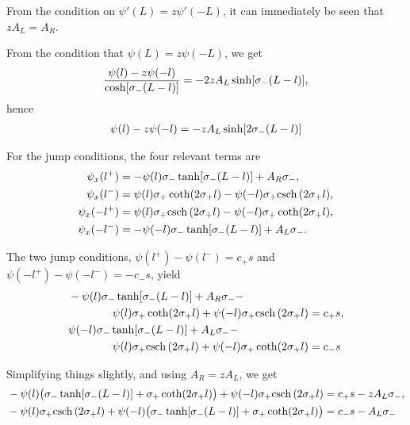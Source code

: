 From the condition on $\psi'(L) = z\psi'(-L)$, it can immediately be seen that $zA_L = A_R$.

From the condition that $\psi(L) = z\psi(-L)$, we get
% 
\begin{equation*}
\begin{split}
	\frac{\psi(l)-z\psi(-l)}{\cosh[\sigma_-(L-l)]} = -2zA_L\sinh[\sigma_-(L-l)],
\end{split}
\end{equation*}
% 
hence
% 
\begin{equation}
\label{eqn:floquet1}
\begin{split}
	\psi(l)-z\psi(-l) = -zA_L\sinh[2\sigma_-(L-l)]
\end{split}
\end{equation}
% 

For the jump conditions, the four relevant terms are
% 
\begin{equation*}
\begin{split}
\begin{aligned}
	\psi_x(l^+) &= -\psi(l)\sigma_-\tanh[\sigma_-(L-l)] + A_R\sigma_-,\\
	\psi_x(l^-) &=  \psi(l)\sigma_+\coth(2\sigma_+l) - \psi(-l)\sigma_+\mathrm{csch} \,(2\sigma_+l),\\
	\psi_x(-l^+) &= \psi(l)\sigma_+\mathrm{csch} \,(2\sigma_+l) - \psi(-l)\sigma_+\coth(2\sigma_+l),\\
	\psi_x(-l^-) &= -\psi(-l)\sigma_-\tanh[\sigma_-(L-l)] + A_L\sigma_-.
\end{aligned}
\end{split}
\end{equation*}
% 

The two jump conditions, $\psi(l^+) - \psi(l^-) = c_+s$ and $\psi(-l^+) - \psi(-l^-) = - c_-s$, yield
% 
\begin{equation*}
\begin{split}
\begin{aligned}
	& -\psi(l)\sigma_-\tanh[\sigma_-(L-l)] + A_R\sigma_- - \\
	 & \qquad\qquad \psi(l)\sigma_+\coth(2\sigma_+l) + \psi(-l)\sigma_+\mathrm{csch} \,(2\sigma_+l) = c_+s,\\
	&\psi(-l)\sigma_-\tanh[\sigma_-(L-l)] + A_L\sigma_- -  \\
	 & \qquad\qquad \psi(l)\sigma_+\mathrm{csch} \,(2\sigma_+l) + \psi(-l)\sigma_+\coth(2\sigma_+l) = c_-s
\end{aligned}
\end{split}
\end{equation*}
% 

Simplifying things slightly, and using $A_R = zA_L$, we get
% 
\begin{equation}
\label{eqn:psii}
\begin{split}
\begin{aligned}
	& -\psi(l)\big(\sigma_-\tanh[\sigma_-(L-l)] + \sigma_+\coth(2\sigma_+l) \big) + \psi(-l)\sigma_+\mathrm{csch} \,(2\sigma_+l) = c_+s - zA_L\sigma_-,\\
	& -\psi(l)\sigma_+\mathrm{csch} \,(2\sigma_+l) + \psi(-l)\big(\sigma_-\tanh[\sigma_-(L-l)] + \sigma_+\coth(2\sigma_+l)\big)  = c_-s - A_L\sigma_-
\end{aligned}
\end{split}
\end{equation}
% 

